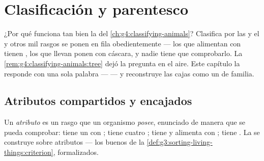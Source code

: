 \chapter{Clasificación y parentesco}\label{ch:g6:classification-kinship}

¿Por qué funciona tan bien la  del
\cref{ch:g4:classifying-animals}? Clasifica  por las  y
el  y otros mil rasgos se ponen en fila obedientemente --- los que
alimentan con  tienen , los que llevan 
ponen  con cáscara, y nadie tiene que comprobarlo. La
\cref{rem:g4:classifying-animals:tree} dejó la pregunta en el aire.
Este capítulo la responde con una sola palabra ---  --- y
reconstruye las cajas como un  de familia.

\section{Atributos compartidos y encajados}

\begin{definition}[Atributo]\label{def:g6:classification-kinship:attribute}
Un \emph{atributo} es un rasgo que un organismo
\emph{posee}, enunciado de manera que se pueda comprobar: tiene un
 con ; tiene cuatro ; tiene 
y alimenta con ; tiene . La  se construye sobre
atributos --- los buenos  de la
\cref{def:g3:sorting-living-things:criterion}, formalizados.
\end{definition}

